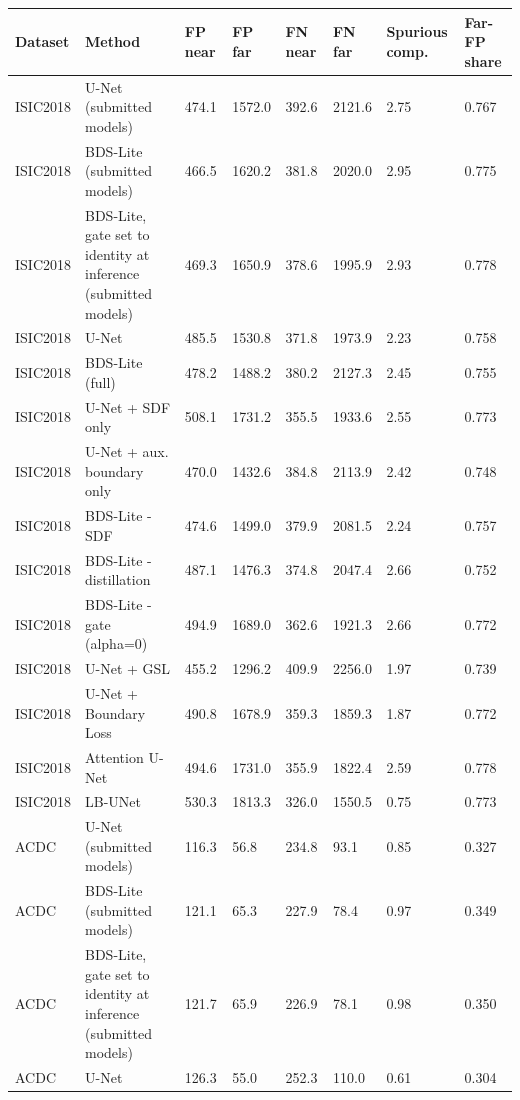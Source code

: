 \begin{tabular}{llllllll}
\toprule
Dataset & Method & FP near & FP far & FN near & FN far & Spurious comp. & Far-FP share \\
\midrule
ISIC2018 & U-Net (submitted models) & 474.1 & 1572.0 & 392.6 & 2121.6 & 2.75 & 0.767 \\
ISIC2018 & BDS-Lite (submitted models) & 466.5 & 1620.2 & 381.8 & 2020.0 & 2.95 & 0.775 \\
ISIC2018 & BDS-Lite, gate set to identity at inference (submitted models) & 469.3 & 1650.9 & 378.6 & 1995.9 & 2.93 & 0.778 \\
ISIC2018 & U-Net & 485.5 & 1530.8 & 371.8 & 1973.9 & 2.23 & 0.758 \\
ISIC2018 & BDS-Lite (full) & 478.2 & 1488.2 & 380.2 & 2127.3 & 2.45 & 0.755 \\
ISIC2018 & U-Net + SDF only & 508.1 & 1731.2 & 355.5 & 1933.6 & 2.55 & 0.773 \\
ISIC2018 & U-Net + aux. boundary only & 470.0 & 1432.6 & 384.8 & 2113.9 & 2.42 & 0.748 \\
ISIC2018 & BDS-Lite - SDF & 474.6 & 1499.0 & 379.9 & 2081.5 & 2.24 & 0.757 \\
ISIC2018 & BDS-Lite - distillation & 487.1 & 1476.3 & 374.8 & 2047.4 & 2.66 & 0.752 \\
ISIC2018 & BDS-Lite - gate (alpha=0) & 494.9 & 1689.0 & 362.6 & 1921.3 & 2.66 & 0.772 \\
ISIC2018 & U-Net + GSL & 455.2 & 1296.2 & 409.9 & 2256.0 & 1.97 & 0.739 \\
ISIC2018 & U-Net + Boundary Loss & 490.8 & 1678.9 & 359.3 & 1859.3 & 1.87 & 0.772 \\
ISIC2018 & Attention U-Net & 494.6 & 1731.0 & 355.9 & 1822.4 & 2.59 & 0.778 \\
ISIC2018 & LB-UNet & 530.3 & 1813.3 & 326.0 & 1550.5 & 0.75 & 0.773 \\
ACDC & U-Net (submitted models) & 116.3 & 56.8 & 234.8 & 93.1 & 0.85 & 0.327 \\
ACDC & BDS-Lite (submitted models) & 121.1 & 65.3 & 227.9 & 78.4 & 0.97 & 0.349 \\
ACDC & BDS-Lite, gate set to identity at inference (submitted models) & 121.7 & 65.9 & 226.9 & 78.1 & 0.98 & 0.350 \\
ACDC & U-Net & 126.3 & 55.0 & 252.3 & 110.0 & 0.61 & 0.304 \\

\end{tabular}
